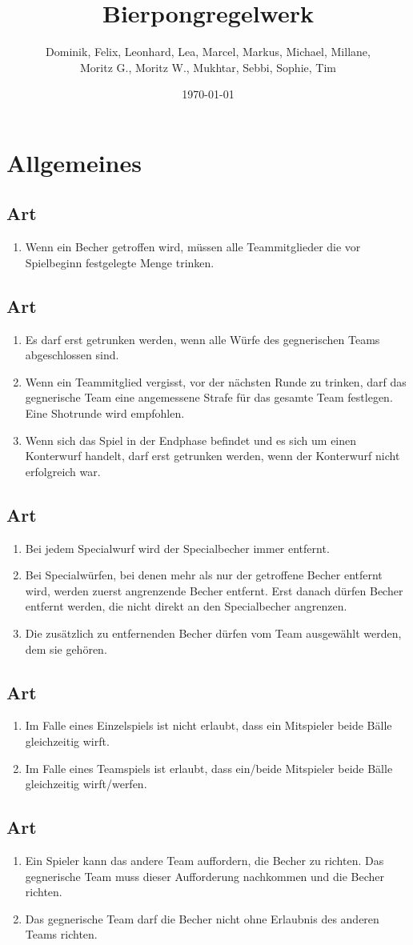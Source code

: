 \documentclass[a4paper,11pt]{scrartcl}
\title{\Huge{Bierpongregelwerk}}
\author{Dominik, Felix, Leonhard, Lea, Marcel, Markus, Michael, Millane, \\Moritz G., Moritz W., Mukhtar, Sebbi, Sophie, Tim}
\date{\small{\today}}
\newcommand{\enum}[1]{\begin{enumerate}[label=(\arabic*)]#1\end{enumerate}}
\newcommand{\art}[2]{\subsection*{#1} \enum{#2}}
\newcounter{art}
\begin{document}
 
\maketitle
\vspace*{-1cm}
\newpage

\section{Allgemeines}
    \art{Art \theart}{
        \item
            Wenn ein Becher getroffen wird, müssen alle Teammitglieder die vor Spielbeginn festgelegte Menge trinken.
    }

    \art{Art \theart}{
        \item
            Es darf erst getrunken werden, wenn alle Würfe des gegnerischen Teams abgeschlossen sind.
        \item
            Wenn ein Teammitglied vergisst, vor der nächsten Runde zu trinken, darf das gegnerische Team eine angemessene Strafe für das gesamte Team festlegen. Eine Shotrunde wird empfohlen.
        \item
            Wenn sich das Spiel in der Endphase befindet und es sich um einen Konterwurf handelt, darf erst getrunken werden, wenn der Konterwurf nicht erfolgreich war.
    }

    \art{Art \theart}{
        \item
            Bei jedem Specialwurf wird der Specialbecher immer entfernt.
        \item
            Bei Specialwürfen, bei denen mehr als nur der getroffene Becher entfernt wird, werden zuerst angrenzende Becher entfernt. Erst danach dürfen Becher entfernt werden, die nicht direkt an den Specialbecher angrenzen.
        \item
            Die zusätzlich zu entfernenden Becher dürfen vom Team ausgewählt werden, dem sie gehören.
    }

    \art{Art \theart}{
        \item
            Im Falle eines Einzelspiels ist nicht erlaubt, dass ein Mitspieler beide Bälle gleichzeitig wirft.
        \item
            Im Falle eines Teamspiels ist erlaubt, dass ein/beide Mitspieler beide Bälle gleichzeitig wirft/werfen.
    }

    \art{Art \theart}{
        \item
            Ein Spieler kann das andere Team auffordern, die Becher zu richten. Das gegnerische Team muss dieser Aufforderung nachkommen und die Becher richten.
        \item
            Das gegnerische Team darf die Becher nicht ohne Erlaubnis des anderen Teams richten.
    }
\end{document}
